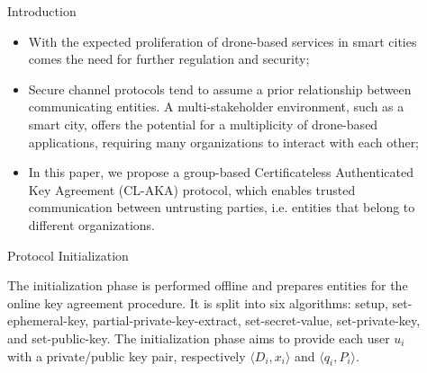 \documentclass[final]{beamer}
\newlength{\sepwid}
\newlength{\onecolwid}
\newlength{\twocolwid}
\begin{document}
\begin{frame}[t]
\begin{columns}[t]
\begin{column}{\onecolwid}
\begin{block}{Introduction}
\begin{itemize}
	\item With the expected proliferation of drone-based services in smart cities comes the need for further regulation and security; \vspace*{0.4cm}
	\item Secure channel protocols tend to assume a prior relationship between communicating entities. A multi-stakeholder environment, such as a smart city, offers the potential for a multiplicity of drone-based applications, requiring many organizations to interact with each other; \vspace*{0.4cm}
	\item In this paper, we propose a group-based Certificateless Authenticated Key Agreement (CL-AKA) protocol, which enables trusted communication between untrusting parties, i.e. entities that belong to different organizations.
\end{itemize}

\end{block}


\begin{block}{Protocol Initialization}

The initialization phase is performed offline and prepares entities for the online key agreement procedure. It is split into six algorithms: setup, set-ephemeral-key, partial-private-key-extract, set-secret-value, set-private-key, and set-public-key. The initialization phase aims to provide each user $u_i$ with a private/public key pair, respectively $\langle D_i, x_i\rangle$ and $\langle q_i, P_i\rangle$.

\end{block}

\end{column} %


\begin{column}{\sepwid}\end{column} %

\begin{column}{\twocolwid} %


\end{column}
\end{columns}
\end{frame}
\end{document}
